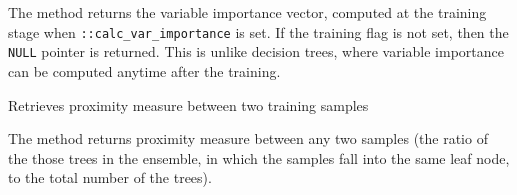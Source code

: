 The method returns the variable importance vector, computed at the training stage when \texttt{::calc\_var\_importance} is set. If the training flag is not set, then the \texttt{NULL} pointer is returned. This is unlike decision trees, where variable importance can be computed anytime after the training.



Retrieves proximity measure between two training samples


The method returns proximity measure between any two samples (the ratio of the those trees in the ensemble, in which the samples fall into the same leaf node, to the total number of the trees).



